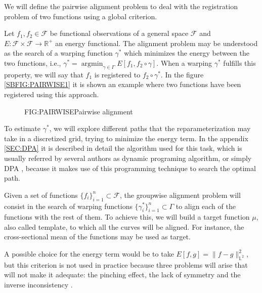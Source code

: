 
We will define the pairwise alignment problem \cite{Srivastava2016} to deal with
the registration problem of two functions using a global criterion.

Let $f_1, f_2 \in \mathcal{F}$ be functional observations of a general space
$\mathcal{F}$ and $E: \mathcal{F} \times \mathcal{F} \rightarrow \mathbb{R}^+$ an energy
functional. The alignment problem may be understood as the search of a warping
function $\gamma^*$ which minimizes the energy between the two functions, i.e.,
$\gamma^* = \operatorname{argmin}_{\gamma \in \Gamma} E[f_1, f_2 \circ \gamma]$.
When a warping $\gamma^*$ fulfills this property, we will say that $f_1$ is
registered to $f_2 \circ \gamma^*$. In the figure \ref{SBFIG:PAIRWISE1} it is
shown an example where two functions have been registered using this approach.

\begin{figure}[Pairwise alignment]{FIG:PAIRWISE}{Pairwise alignment}
	 \quad
\end{figure}

To estimate $\gamma^*$, we will explore different paths that the
reparameterization may take in a discretized grid, trying to minimize the energy
term. In the appendix \ref{SEC:DPA}  it is described in detail the algorithm used for this
task, which is usually referred by several authors as dynamic programing
algorithm, or simply DPA \cite{dpa}, because it makes use of this programming
technique to search the optimal path.



Given a set of functions $\{f_i\}_{i=1}^n \subset \mathcal{F}$, the
groupwise alignment problem will consist in the search of warping functions
$\{\gamma_i^* \}_{i=1}^n \subset \Gamma$ to align each of the functions with the
rest of them. To achieve this, we will build a target function $\mu$, also
called template, to which all the curves will be aligned. For instance,
the cross-sectional mean of the functions may be used as target.

A possible choice for the energy term would be to take
$E[f,g]= \|f - g\|_{\mathbb{L}^2}^2$, but
this criterion is not used in practice because three
problems will arise that will not make it adequate: the pinching effect, the
lack of symmetry and the inverse inconsistency \cite{Marron2015}.
